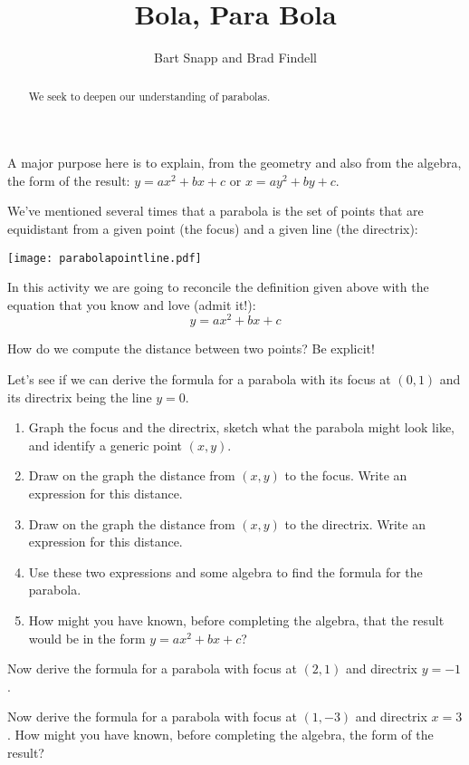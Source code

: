 \documentclass[nooutcomes]{ximera}
\title{Bola, Para Bola}
\author{Bart Snapp and Brad Findell}
\begin{document}
\begin{abstract}
  We seek to deepen our understanding of parabolas.
\end{abstract}
\maketitle

\begin{teachingnote}
A major purpose here is to explain, from the geometry and also from the algebra, the form of the result:
$y = ax^2 + bx + c$ or $x = ay^2 + by + c$.  
\end{teachingnote}
We've mentioned several times that a parabola is the set of points
that are equidistant from a given point (the focus) and a given line
(the directrix):
\begin{image}
\texttt{[image: parabolapointline.pdf]}
\end{image}
In this activity we are going to reconcile the definition given
above with the equation that you know and love (admit it!):
\[
y = ax^2 + bx + c
\]

\begin{problem}
How do we compute the distance between two points? Be explicit!
\vspace{0.5in}
\end{problem}

\begin{problem}
Let's see if we can derive the formula for a parabola with its focus at $(0,1)$ and its directrix being the line $y=0$.
\begin{enumerate}
\item Graph the focus and the directrix, sketch what the parabola might look like, and identify a generic point $(x, y)$.  
\vfill
\newpage 

\item Draw on the graph the distance from $(x,y)$ to the focus.  Write an expression for this distance.  
\vspace{0.5in}
\item Draw on the graph the distance from $(x,y)$ to the directrix.  Write an expression for this distance.  
\vspace{0.5in}
\item Use these two expressions and some algebra to find the formula for the parabola. 
\vspace{0.5in}
\item How might you have known, before completing the algebra, that the result would be in the form 
$y = ax^2 + bx + c$? 
\end{enumerate}
\vspace{0.5in}
\end{problem}

\begin{problem}
Now derive the formula for a parabola with focus at $(2,1)$ and directrix $y=-1$.
\vfill
\end{problem}

\begin{problem}
Now derive the formula for a parabola with focus at $(1,-3)$ and directrix $x=3$.  How might you have known, before completing the algebra, the form of the result?   
\vfill
\end{problem}
\end{document}

